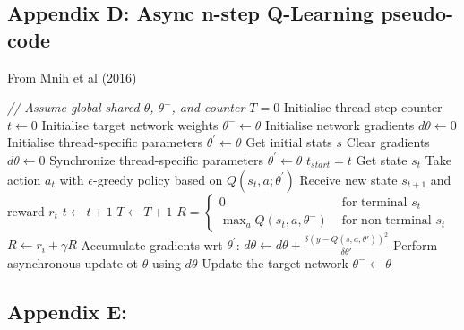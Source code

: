 \documentclass{article}
\begin{document}
\subsection*{Appendix D: Async n-step Q-Learning pseudo-code}
\label{async_q_n_step_pseudo}

From Mnih et al (2016)

\begin{algorithmic}[1]
\State \textit{// Assume global shared  $\theta$, $\theta^{-}$, and counter $T = 0$}
\State Initialise thread step counter $t \gets 0$
\State Initialise target network weights $\theta^{-} \gets \theta$
\State Initialise network gradients $d\theta \gets 0$
\State Initialise thread-specific parameters $\theta^\prime \gets \theta$
\State Get initial stats $s$
    \State Clear gradients $d\theta \gets 0$
    \State Synchronize thread-specific parameters $\theta^\prime \gets \theta$
    \State $t_{start} = t$
    \State Get state $s_t$
        \State Take action $a_t$ with $\epsilon$-greedy policy based on $Q\left(s_t,a;\theta^\prime\right)$
        \State Receive new state $s_{t+1}$ and reward $r_t$
        \State $t \gets t + 1$
        \State $T \gets T + 1$
    \EndWhile
    \State $R= \begin{cases}0 & \text { for terminal } s_t \\ \max _{a} Q\left(s_t, a, \theta^{-}\right) & \text { for non terminal } s_t\end{cases}$
        \State $R \gets r_i + \gamma R$
        \State Accumulate gradients wrt $\theta^\prime$: $d\theta \gets d\theta + \frac{\delta\left( y-Q\left(s, a, \theta\prime\right)\right)^{2}}{\delta\theta\prime}$
    \EndFor
    \State Perform asynchronous update ot $\theta$ using $d\theta$
        \State Update the target network $\theta^{-} \gets \theta$
    \EndIf
\EndWhile

\end{algorithmic}


\subsection*{Appendix E: }
\end{document}
